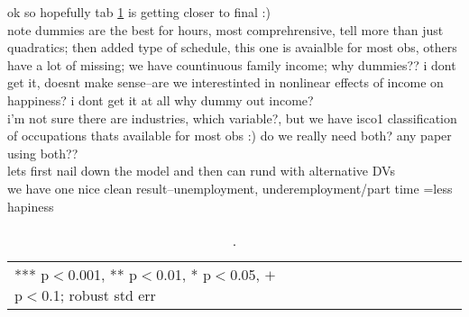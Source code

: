 \documentclass[10pt, letterpaper]{article}
\begin{document}
\begin{spacing}{1.4}




ok so hopefully tab \ref{fA} is getting closer to final :)\\
note dummies are the best for hours, most comprehrensive, tell more than just
quadratics; then added type of schedule, this one is avaialble for most obs,
others have a lot of missing; we have countinuous family income; why dummies?? i
dont get it, doesnt make sense--are we interestinted in nonlinear effects of
income on happiness? i dont get it at all why dummy out income?\\

i'm not sure there are industries, which variable?, but we have isco1 classification of occupations thats available for most obs :) do we really need both? any paper using both??\\

lets first nail down the model and then can rund with alternative DVs\\

we have one nice clean result--unemployment, underemployment/part time =less hapiness

\begin{spacing}{.9}
  \begin{table}[H]\centering \caption{.} \label{fA} \begin{scriptsize} \begin{tabular}{p{1.8in}p{.5in}p{.5in}p{.5in}p{.5in}p{.5in}p{.5in}p{.5in}p{.5in}p{.5in}p{.5
            in}p{.5in}p{.5 in}}\hline
        
\hline  *** p$<$0.001, ** p$<$0.01, * p$<$0.05, $+$ p$<$0.1; robust std err
         \end{tabular}\end{scriptsize}\end{table}
\end{spacing}






\end{spacing}
\end{document}
